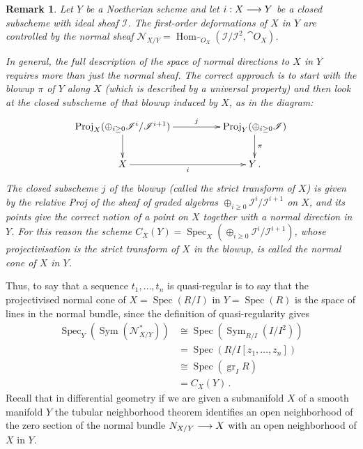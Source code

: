\documentclass[english,letter paper,12pt,leqno]{article}
\theoremstyle{example}
\newtheorem{remark}[theorem]{Remark}
\numberwithin{equation}{section}
\def\Hom{\operatorname{Hom}}
\DeclareMathOperator{\Spec}{Spec}
\begin{document}
\begin{remark} Let $Y$ be a Noetherian scheme and let $i: X \longrightarrow Y$ be a closed subscheme with ideal sheaf $\mathscr{I}$. The first-order deformations of $X$ in $Y$ are controlled \cite[Theorem VI-29]{eisenbudharris} by the normal sheaf $\mathscr{N}_{X/Y} = \Hom_{\cat{O}_X}(\mathscr{I}/\mathscr{I}^2, \cat{O}_X)$.

In general, the full description of the space of normal directions to $X$ in $Y$ requires more than just the normal sheaf. The correct approach is to start with the blowup $\pi$ of $Y$ along $X$ (which is described by a universal property) and then look at the closed subscheme of that blowup induced by $X$, as in the diagram:
\[
\xymatrix@C+2pc{
\operatorname{Proj}_X( \oplus_{i \ge 0} \mathscr{I}^i/\mathscr{I}^{i+1} ) \ar[r]^-j\ar[d] & \operatorname{Proj}_Y( \oplus_{i \ge 0} \mathscr{I} ) \ar[d]^-{\pi}\\
X \ar[r]_-{i} & Y\,.
}
\]
The closed subscheme $j$ of the blowup (called the strict transform of $X$) is given by the relative Proj of the sheaf of graded algebras $\oplus_{i \ge 0} \mathscr{I}^i/\mathscr{I}^{i+1}$ on $X$, and its points give the correct notion of a point on $X$ together with a normal direction in $Y$. For this reason the scheme $C_X(Y) = \Spec_X( \oplus_{i \ge 0} \mathscr{I}^i / \mathscr{I}^{i+1} )$, whose projectivisation is the strict transform of $X$ in the blowup, is called the \emph{normal cone} of $X$ in $Y$.
\end{remark}

Thus, to say that a sequence $t_1,\ldots,t_n$ is quasi-regular is to say that the projectivised normal cone of $X = \Spec(R/I)$ in $Y = \Spec(R)$ is the space of lines in the normal bundle, since the definition of quasi-regularity gives 
\begin{align*}
\Spec_{Y}( \operatorname{Sym}( \mathscr{N}^*_{X/Y} ) ) &\cong \Spec( \operatorname{Sym}_{R/I}( I/I^2 ) )\\
&= \Spec( R/I[z_1,\ldots,z_n] )\\
&\cong \Spec( \operatorname{gr}_ I R)\\
&= C_X(Y)\,.
\end{align*}
Recall that in differential geometry if we are given a submanifold $X$ of a smooth manifold $Y$ the tubular neighborhood theorem \cite[\S 4.5]{hirsch} identifies an open neighborhood of the zero section of the normal bundle $N_{X/Y} \longrightarrow X$ with an open neighborhood of $X$ in $Y$. 
\end{document}
